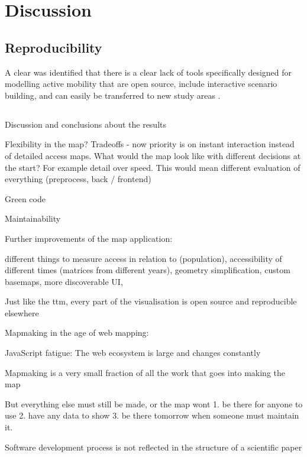\section{Discussion}

\subsection{}

\subsection{Reproducibility}
A clear was identified that there is a clear lack of tools
specifically designed for modelling active mobility that are open source,
include interactive scenario building,
and can easily be transferred to new study areas \parencite{paj2021}.

\subsection{}
Discussion and conclusions about the results

Flexibility in the map? Tradeoffs - now priority is on instant interaction instead of detailed access maps.
What would the map look like with different decisions at the start? For example detail over speed.
This would mean different evaluation of everything (preprocess, back / frontend)

Green code

Maintainability

Further improvements of the map application:

different things to measure access in relation to (population),
accessibility of different times (matrices from different years),
geometry simplification,
custom basemaps,
more discoverable UI,

Just like the \acrshort{ttm}, every part of the visualisation is open source and reproducible elsewhere

Mapmaking in the age of web mapping:

JavaScript fatigue: The web ecosystem is large and changes constantly

Mapmaking is a very small fraction of all the work that goes into making the map

But everything else must still be made, or the map wont 1. be there for anyone to use 2. have any data to show 3. be there tomorrow when someone must maintain it.

Software development process is not reflected in the structure of a scientific paper
